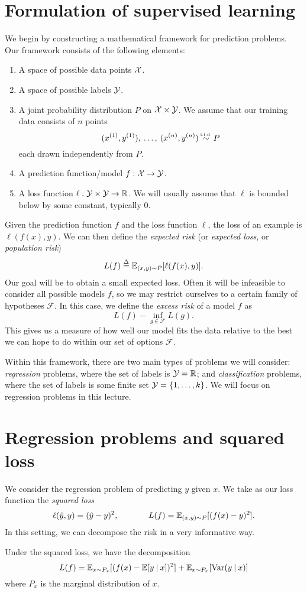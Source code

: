 \section{Formulation of supervised learning}
We begin by constructing a mathematical framework for prediction problems. Our framework consists of the following elements:
\begin{enumerate}
	\item A space of possible data points $\mathcal{X}$.
	\item A space of possible labels $\mathcal{Y}$.
	\item A joint probability distribution $P$ on $\mathcal{X}\times \mathcal{Y}$. We assume that our training data consists of $n$ points $$(x^{(1)}, y^{(1)}), \: \ldots, \: (x^{(n)}, y^{(n)}) \: \iid \: P$$ each drawn independently from $P$.
	\item A prediction function/model $f: \mathcal{X}\rightarrow \mathcal{Y}$.
	\item A loss function $\ell: \mathcal{Y}\times \mathcal{Y}\rightarrow \mathbb{R}$. We will usually assume that $\ell$ is bounded below by some constant, typically $0$.
\end{enumerate}
Given the prediction function $f$ and the loss function $\ell$, the loss of an example is $\ell(f(x),y)$. We can then define the \textit{expected risk} (or \textit{expected loss}, or \textit{population risk})
$$L(f) \defn \E_{(x,y)\sim P} [\ell(f(x),y)].$$ Our goal will be to obtain a small expected loss. Often it will be infeasible to consider all possible models $f$, so we may restrict ourselves to a certain family of hypotheses $\mathcal{F}$. In this case, we define the \textit{excess risk} of a model $f$ as $$L(f) - \inf_{g\in\mathcal{F}} L(g).$$ This gives us a measure of how well our model fits the data relative to the best we can hope to do within our set of options $\mathcal{F}$.

Within this framework, there are two main types of problems we will consider: \textit{regression} problems, where the set of labels is $\mathcal{Y}=\mathbb{R}$; and \textit{classification} problems, where the set of labels is some finite set $\mathcal{Y}=\{1,\ldots,k\}$. We will focus on regression problems in this lecture.

\section{Regression problems and squared loss}
We consider the regression problem of predicting $y$ given $x$. We take as our loss function the \textit{squared loss} $$\ell(\hat{y},y) = (\hat{y}-y)^2, \hspace{.5in} L(f) = \mathbb{E}_{(x,y)\sim P}[(f(x)-y)^2].$$ In this setting, we can decompose the risk in a very informative way.
\begin{lemma} \label{decomp}
Under the squared loss, we have the decomposition $$L(f) = \mathbb{E}_{x\sim P_x} [(f(x)-\mathbb{E}[y \: | \: x])^2] + \mathbb{E}_{x\sim P_x}[\mathrm{Var}(y\: | \:x)]$$ where $P_x$ is the marginal distribution of $x$.
\end{lemma}

